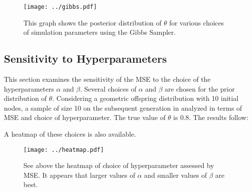 \documentclass[11 pt]{article}
\renewcommand{\th}{\theta}
\begin{document}



\begin{figure}[!h]
\begin{center}
\texttt{[image: ../gibbs.pdf]}
\caption{This graph shows the posterior distribution of $\th$ for various choices of simulation parameters using the Gibbs Sampler.}
\label{fig:gibbs}
\end{center}
\end{figure}


\subsection{Sensitivity to Hyperparameters}

This section examines the sensitivity of the MSE to the choice of the hyperparameters $\alpha$ and $\beta$. Several choices of $\alpha$ and $\beta$ are chosen for the prior distribution of $\th$. Considering a geometric offspring distribution with 10 initial nodes, a sample of size 10 on the subsequent generation in analyzed in terms of MSE and choice of hyperparameter. The true value of $\th$ is 0.8. The results follow:



A heatmap of these choices is also available.

\begin{figure}[!h]
\begin{center}
\label{fig:heatmap}
\caption{See above the heatmap of choice of hyperparameter assessed by MSE. It appears that larger values of $\alpha$ and smaller values of $\beta$ are best.}
\texttt{[image: ../heatmap.pdf]}
\end{center}

\end{figure}
\end{document}
